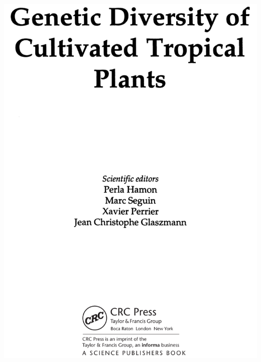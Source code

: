 \documentclass[
  ignorenonframetext,
  aspectratio=169]{beamer}
\begin{document}
\begin{frame}{}
\protect\hypertarget{section-5}{}
\begin{center}\includegraphics[width=0.5\linewidth]{../images/Genetic_diversity_of_cultivated_plants_textbook} \end{center}
\end{frame}
\end{document}
